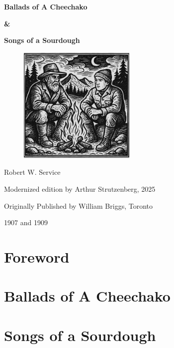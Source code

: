 \documentclass[10pt]{book}
\begin{document}
\thispagestyle{empty}
\null
\newpage

\thispagestyle{empty}
\null
\newpage

\begin{titlepage}
\centering
{\Huge\bfseries Ballads of A Cheechako\par}
{\Huge\bfseries \&\par}
{\Huge\bfseries Songs of a Sourdough\par}
\vspace{2em}

\begin{figure}[htbp]
  \centering
  \includegraphics[width=0.5\textwidth]{images/fireside}
\end{figure}

{\Huge Robert W. Service\par}


\vspace{10em}
{\large Modernized edition by Arthur Strutzenberg, 2025\par}
{\large Originally Published by William Briggs, Toronto\par}
{\large 1907 and 1909}
\end{titlepage}

\thispagestyle{empty}
\null
\newpage

\frontmatter
\tableofcontents
\cleardoublepage

\mainmatter


\chapter*{Foreword}

\cleardoublepage
\thispagestyle{empty}

\cleardoublepage
\chapter*{Ballads of A Cheechako}


\cleardoublepage
\chapter*{Songs of a Sourdough}

\end{document}
